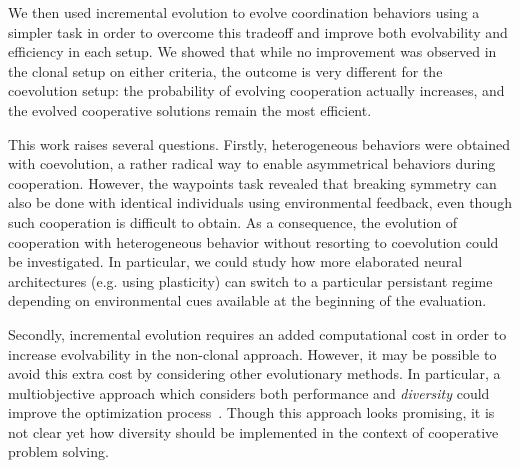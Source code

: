   We then used incremental evolution to evolve coordination behaviors using a simpler task in order to overcome this tradeoff and improve both evolvability and efficiency in each setup. We showed that while no improvement was observed in the clonal setup on either criteria, the outcome is very different for the coevolution setup: the probability of evolving cooperation actually increases, and the evolved cooperative solutions remain the most efficient.
 
  This work raises several questions. Firstly, heterogeneous behaviors were obtained with coevolution, a rather radical way to enable asymmetrical behaviors during cooperation. However, the waypoints task revealed that breaking symmetry can also be done with identical individuals using environmental feedback, even though such cooperation is difficult to obtain. As a consequence,  the evolution of cooperation with heterogeneous behavior without resorting to coevolution could be investigated. In particular, we could study how more elaborated neural architectures (e.g. using plasticity) can switch to a particular persistant regime depending on environmental cues available at the beginning of the evaluation.

  Secondly, incremental evolution requires an added computational cost in order to increase evolvability in the non-clonal approach. However, it may be possible to avoid this extra cost by considering other evolutionary methods. In particular, a multiobjective approach which considers both performance and \emph{diversity} could improve the optimization process~\parencite{Lehman2008, Doncieux2014a}. Though this approach looks promising, it is not clear yet how diversity should be implemented in the context of cooperative problem solving.